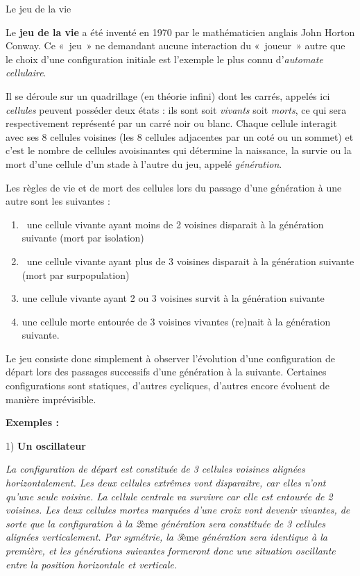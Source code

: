 \begin{Exercice}{Le jeu de la vie}

{
{Le }{\textbf{jeu de la
vie}}{ a été inventé en 1970 par le
mathématicien anglais John Horton Conway. Ce «~jeu~» ne demandant
aucune interaction du «~joueur~» autre que le choix d’une configuration
initiale est l’exemple le plus connu
d’}{\textit{automate
cellulaire}}{.}}

{
{Il se déroule sur un quadrillage (en théorie
infini) dont les carrés, appelés ici
}{\textit{cellules}}{
peuvent posséder deux états : ils sont soit
}{\textit{vivants}}{
soit
}{\textit{morts}}{, ce
qui sera respectivement représenté par un carré noir ou blanc. Chaque
cellule interagit avec ses 8 cellules voisines (les 8 cellules
adjacentes par un coté ou un sommet) et c’est le nombre de cellules
avoisinantes qui détermine la naissance, la survie ou la mort d’une
cellule d’un stade à l’autre du jeu, appelé
}{\textit{génération}}{.}}

{
Les règles de vie et de mort des cellules lors du passage d’une
génération à une autre sont les suivantes :}

\begin{enumerate}
\item {
\ une cellule vivante ayant moins de 2 voisines disparait à la
génération suivante (mort par isolation)}
\item {
\ une cellule vivante ayant plus de 3 voisines disparait à la génération
suivante (mort par surpopulation)}
\item {
une cellule vivante ayant 2 ou 3 voisines survit à la génération
suivante}
\item {
une cellule morte entourée de 3 voisines vivantes (re)nait à la
génération suivante.}
\end{enumerate}
{
Le jeu consiste donc simplement à observer l’évolution d’une
configuration de départ lors des passages successifs d’une génération à
la suivante. Certaines configurations sont statiques, d’autres
cycliques, d’autres encore évoluent de manière imprévisible.}

{\bfseries
{Exemples}{ : }}

{\sffamily
{1) }{\textbf{Un
oscillateur}}}


\bigskip

{\sffamily
{\textit{La configuration de départ est
constituée de 3 cellules voisines alignées horizontalement. Les deux
cellules extrêmes vont disparaitre, car elles n’ont qu’une seule
voisine. La cellule centrale va survivre car elle est entourée de 2
voisines. Les deux cellules mortes marquées d’une croix vont devenir
vivantes, de sorte que la configuration à la
2}}ème{\textit{ génération sera constituée de 3
cellules alignées verticalement. Par symétrie, la
3}}ème{\textit{ génération sera identique à la
première, et les générations suivantes formeront donc une situation
oscillante entre la position horizontale et verticale.}}}


\end{Exercice}
